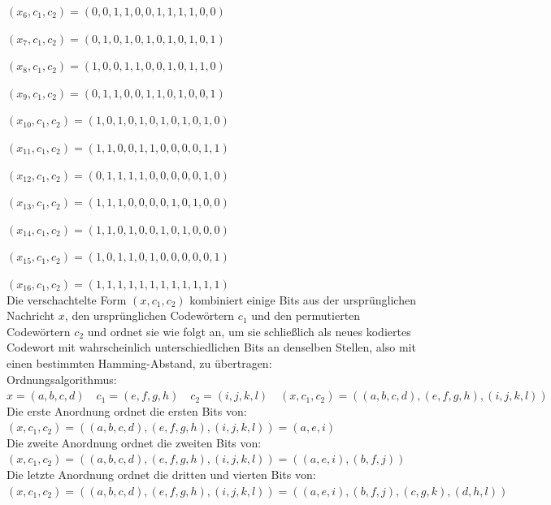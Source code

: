 \begin{Beispiel}
    
    $(x_6, c_1, c_2) = (0,0,1,1, 0,0,1,1, 1,1,0,0)$
    
    
    $(x_7, c_1, c_2) = (0,1,0,1, 0,1,0,1, 0,1,0,1)$
    
    
    $(x_8, c_1, c_2) = (1,0,0,1, 1,0,0,1, 0,1,1,0)$
    
    
    $(x_9, c_1, c_2) = (0,1,1,0, 0,1,1,0, 1,0,0,1)$
    
    
    $(x_{10}, c_1, c_2) = (1,0,1,0, 1,0,1,0, 1,0,1,0)$
    
    
    $(x_{11}, c_1, c_2) = (1,1,0,0, 1,1,0,0, 0,0,1,1)$
    
    
    $(x_{12}, c_1, c_2) = (0,1,1,1, 1,0,0,0, 0,0,1,0)$
    
    
    $(x_{13}, c_1, c_2) = (1,1,1,0, 0,0,0,1, 0,1,0,0)$
    
    
    $(x_{14}, c_1, c_2) = (1,1,0,1, 0,0,1,0, 1,0,0,0)$
    
    
    $(x_{15}, c_1, c_2) = (1,0,1,1, 0,1,0,0, 0,0,0,1)$
     
    
    $(x_{16}, c_1, c_2) = (1,1,1,1, 1,1,1,1, 1,1,1,1)$\\
    
    Die verschachtelte Form $(x,c_1,c_2)$ kombiniert einige Bits aus der ursprünglichen Nachricht $x$, den ursprünglichen Codewörtern $c_1$ und den permutierten Codewörtern $c_2$ und ordnet sie wie folgt an, um sie schlie\ss{}lich als neues kodiertes Codewort mit wahrscheinlich unterschiedlichen Bits an denselben Stellen, also mit einen bestimmten Hamming-Abstand, zu übertragen:\\
    
    Ordnungsalgorithmus:\\
    
    $x= (a,b,c,d) \quad c_1= (e,f,g,h) \quad c_2= (i,j,k,l)\quad (x,c_1,c_2)= ((a,b,c,d), (e,f,g,h), (i,j,k,l))$\\
    
    Die erste Anordnung ordnet die ersten Bits von:\\
    $(x,c_1,c_2) = ((a,b,c,d), (e,f,g,h), (i,j,k,l)) = (a,e,i)$\\
    
    Die zweite Anordnung ordnet die zweiten Bits von:\\
    $(x,c_1,c_2) = ((a,b,c,d), (e,f,g,h), (i,j,k,l)) = ((a,e,i), (b,f,j))$\\
    
    Die letzte Anordnung ordnet die dritten und vierten Bits von:\\
    $(x,c_1,c_2) = ((a,b,c,d), (e,f,g,h), (i,j,k,l)) = ((a,e,i), (b,f,j),(c,g,k), (d,h,l))$\\ 
    

\end{Beispiel}
